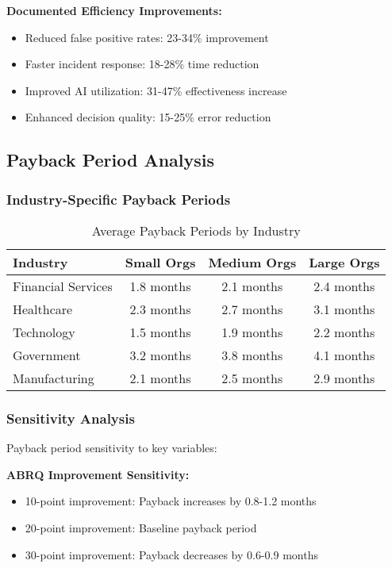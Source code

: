 \documentclass[11pt,a4paper]{article}
\begin{document}
\textbf{Documented Efficiency Improvements:}
\begin{itemize}
\item Reduced false positive rates: 23-34\% improvement
\item Faster incident response: 18-28\% time reduction
\item Improved AI utilization: 31-47\% effectiveness increase
\item Enhanced decision quality: 15-25\% error reduction
\end{itemize}

\subsection{Payback Period Analysis}

\subsubsection{Industry-Specific Payback Periods}

\begin{table}[H]
\centering
\caption{Average Payback Periods by Industry}
\label{tab:payback_periods}
\begin{tabular}{lccc}
\toprule
Industry & Small Orgs & Medium Orgs & Large Orgs \\
\midrule
Financial Services & 1.8 months & 2.1 months & 2.4 months \\
Healthcare & 2.3 months & 2.7 months & 3.1 months \\
Technology & 1.5 months & 1.9 months & 2.2 months \\
Government & 3.2 months & 3.8 months & 4.1 months \\
Manufacturing & 2.1 months & 2.5 months & 2.9 months \\
\bottomrule
\end{tabular}
\end{table}

\subsubsection{Sensitivity Analysis}

Payback period sensitivity to key variables:

\textbf{ABRQ Improvement Sensitivity:}
\begin{itemize}
\item 10-point improvement: Payback increases by 0.8-1.2 months
\item 20-point improvement: Baseline payback period
\item 30-point improvement: Payback decreases by 0.6-0.9 months
\end{itemize}
\end{document}

